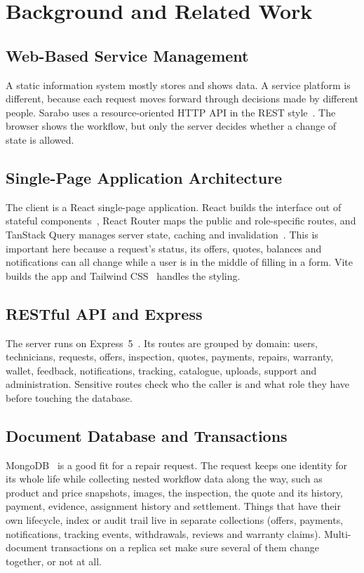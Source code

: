 \documentclass{standalone}
\begin{document}
\chapter{Background and Related Work}

\section{Web-Based Service Management}
A static information system mostly stores and shows data. A service platform is different, because each request moves forward through decisions made by different people. Sarabo uses a resource-oriented HTTP API in the REST style~\cite{fielding2000}. The browser shows the workflow, but only the server decides whether a change of state is allowed.

\section{Single-Page Application Architecture}
The client is a React single-page application. React builds the interface out of stateful components~\cite{react}, React Router maps the public and role-specific routes, and TanStack Query manages server state, caching and invalidation~\cite{tanstack}. This is important here because a request's status, its offers, quotes, balances and notifications can all change while a user is in the middle of filling in a form. Vite~\cite{vite} builds the app and Tailwind CSS~\cite{tailwind} handles the styling.

\section{RESTful API and Express}
The server runs on Express~5~\cite{express}. Its routes are grouped by domain: users, technicians, requests, offers, inspection, quotes, payments, repairs, warranty, wallet, feedback, notifications, tracking, catalogue, uploads, support and administration. Sensitive routes check who the caller is and what role they have before touching the database.

\section{Document Database and Transactions}
MongoDB~\cite{mongodb} is a good fit for a repair request. The request keeps one identity for its whole life while collecting nested workflow data along the way, such as product and price snapshots, images, the inspection, the quote and its history, payment, evidence, assignment history and settlement. Things that have their own lifecycle, index or audit trail live in separate collections (offers, payments, notifications, tracking events, withdrawals, reviews and warranty claims). Multi-document transactions on a replica set make sure several of them change together, or not at all.
\end{document}
